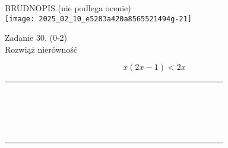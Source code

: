 \documentclass[10pt]{article}
\begin{document}
BRUDNOPIS (nie podlega ocenie)\\
\texttt{[image: 2025\_02\_10\_e5283a420a8565521494g-21]}

Zadanie 30. (0-2)\\
Rozwiąż nierówność

\[
x(2 x-1)<2 x
\]

\begin{center}
\begin{tabular}{|c|c|c|c|c|c|c|c|c|c|c|c|c|c|c|c|c|c|c|c|c|c|c|}
\hline
 &  &  &  &  &  &  &  &  &  &  &  &  &  &  &  &  &  &  &  &  &  &  \\
\hline
 &  &  &  &  &  &  &  &  &  &  &  &  &  &  &  &  &  &  &  &  &  &  \\
\hline
 &  &  &  &  &  &  &  &  &  &  &  &  &  &  &  &  &  &  &  &  &  &  \\
\hline
 &  &  &  &  &  &  &  &  &  &  &  &  &  &  &  &  &  &  &  &  &  &  \\
\hline
 &  &  &  &  &  &  &  &  &  &  &  &  &  &  &  &  &  &  &  &  &  &  \\
\hline
 &  &  &  &  &  &  &  &  &  &  &  &  &  &  &  &  &  &  &  &  &  &  \\
\hline
 &  &  &  &  &  &  &  &  &  &  &  &  &  &  &  &  &  &  &  &  &  &  \\
\hline
 &  &  &  &  &  &  &  &  &  &  &  &  &  &  &  &  &  &  &  &  &  &  \\
\hline
 &  &  &  &  &  &  &  &  &  &  &  &  &  &  &  &  &  &  &  &  &  &  \\
\hline
 &  &  &  &  &  &  &  &  &  &  &  &  &  &  &  &  &  &  &  &  &  &  \\
\hline
 &  &  &  &  &  &  &  &  &  &  &  &  &  &  &  &  &  &  &  &  &  &  \\
\hline
 &  &  &  &  &  &  &  &  &  &  &  &  &  &  &  &  &  &  &  &  &  &  \\
\hline
 &  &  &  &  &  &  &  &  &  &  &  &  &  &  &  &  &  &  &  &  &  &  \\
\hline
 &  &  &  &  &  &  &  &  &  &  &  &  &  &  &  &  &  &  &  &  &  &  \\
\hline
 &  &  &  &  &  &  &  &  &  &  &  &  &  &  &  &  &  &  &  &  &  &  \\
\hline
 &  &  &  &  &  &  &  &  &  &  &  &  &  &  &  &  &  &  &  &  &  &  \\
\hline
 &  &  &  &  &  &  &  &  &  &  &  &  &  &  &  &  &  &  &  &  &  &  \\
\hline
 &  &  &  &  &  &  &  &  &  &  &  &  &  &  &  &  &  &  &  &  &  &  \\

\end{tabular}
\end{center}
\end{document}
